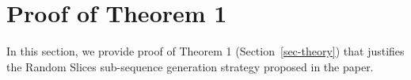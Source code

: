 \documentclass[sigconf]{acmart}
\newtheorem{thm}{Theorem}
\renewcommand{\P}{\mathbb{P}}
\begin{document}
\section{Proof of Theorem 1} \label{app-sec-proof}

In this section, we provide proof of Theorem 1 (Section~\ref{sec-theory}) that justifies the Random Slices sub-sequence generation strategy proposed in the paper.



\end{document}
